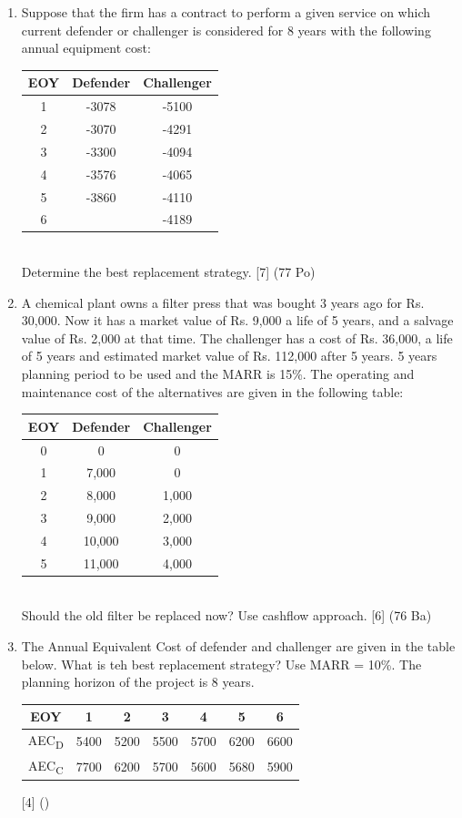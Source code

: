 \documentclass[12pt]{article}
\newcommand{\sub}[1]{\textsubscript{#1}}
\begin{document}
\begin{enumerate}
				\item Suppose that the firm has a contract to perform a given service on which current defender or challenger is considered for 8 years with the following annual equipment cost: \\
				\begin{tabular}{|c|c|c|}
					\hline
					EOY & Defender & Challenger \\ \hline
					1 & -3078 & -5100 \\ \hline
					2 & -3070 & -4291 \\ \hline
					3 & -3300 & -4094 \\ \hline
					4 & -3576 & -4065 \\ \hline
					5 & -3860 & -4110 \\ \hline
					6 & & -4189 \\ \hline
				\end{tabular}\\ 
				Determine the best replacement strategy. \hfill [7] (77 Po)

				\item A chemical plant owns a filter press that was bought 3 years ago for Rs. 30,000. Now it has a market value of Rs. 9,000 a life of 5 years, and a salvage value of Rs. 2,000 at that time. The challenger has a cost of Rs. 36,000, a life of 5 years and estimated market value of Rs. 112,000 after 5 years. 5 years planning period to be used and the MARR is 15\%. The operating and maintenance cost of the alternatives are given in the following table: \\
				\begin{tabular}{|c|c|c|}
					\hline
					EOY & Defender & Challenger \\ \hline
					0 & 0 & 0 \\ \hline
					1 & 7,000 & 0 \\ \hline
					2 & 8,000 & 1,000 \\ \hline
					3 & 9,000 & 2,000 \\ \hline
					4 & 10,000 & 3,000 \\ \hline
					5 & 11,000 & 4,000 \\ \hline
				\end{tabular}\\
				Should the old filter be replaced now? Use cashflow approach. \hfill [6] (76 Ba)

				\item The Annual Equivalent Cost of defender and challenger are given in the table below. What is teh best replacement strategy? Use MARR = 10\%. The planning horizon of the project is 8 years. \\
				\begin{tabular}{|c|c|c|c|c|c|c|}
					\hline
					EOY & 1 & 2 & 3 & 4 & 5 & 6 \\ \hline
					AEC\sub{D} & 5400 & 5200 & 5500 & 5700 & 6200 & 6600 \\ \hline
					AEC\sub{C} & 7700 & 6200 & 5700 & 5600 & 5680 & 5900 \\ \hline
				\end{tabular} \hfill [4] ()


\end{enumerate}
\end{document}
